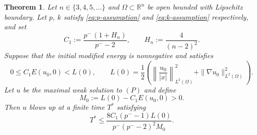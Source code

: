 \documentclass[10pt,a4paper]{amsart}
\newtheorem{theorem}{Theorem}
\newcommand{\R}{\mathbb{R}}
\begin{document}
\begin{theorem} \label{thm:positive}
	Let $n \in \{3,4,5,\ldots\}$ and $\Omega \subset \R^n$ be open bounded with Lipschitz boundary.
	Let $p$, $k$ satisfy \eqref{eq:p-assumption} and \eqref{eq:k-assumption} respectively, and set
	\[
	C_1:=\frac{p^-\,(1+H_n)}{p^- -2},
	\qquad H_n:=\frac{4}{(n-2)^2}.
	\]
	Suppose that the initial modified energy is nonnegative and satisfies
	\[
	0\le C_1E(u_0,0)<L(0),
	\qquad
	L(0)=\frac12\left(
	\left\|\frac{u_0}{|x|}\right\|_{L^2(\Omega)}^2
	+\|\nabla u_0\|_{L^2(\Omega)}^2
	\right).
	\]
	Let $u$ be the maximal weak solution to $(P)$ and define
	\[
	M_0:=L(0)-C_1E(u_0,0)>0.
	\]
	Then $u$ blows up at a finite time $T^*$ satisfying
	\[
	T^*\le
	\frac{8C_1(p^- -1)L(0)}
	{p^-(p^- -2)^2M_0}.
	\]
\end{theorem}
\end{document}
